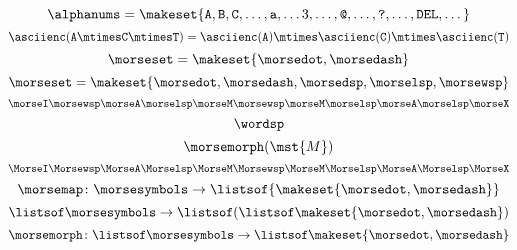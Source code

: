 {\begin{forslides}
\begin{equation}
    \end{equation}
    \begin{equation}
        \label{eq:alphanums_list}
        \alphanums = \makeset{ \texttt{A}, \texttt{B}, \texttt{C}, \dots, \texttt{a}, \dots 3, \dots,  \texttt{@}, \dots, \texttt{?}, \dots, \texttt{DEL}, \dots }
    \end{equation}
    \begin{equation}
        \label{eq:alphanums_list_comp}
        \asciienc( \texttt{A} \mtimes  \texttt{C} \mtimes \texttt{T})
        =\asciienc(\texttt{A}) \mtimes   \asciienc(\texttt{C}) \mtimes \asciienc(\texttt{T})
    \end{equation}
    \begin{equation}
        \label{eq:morse-symbols}
        \morseset = \makeset{ \morsedot, \morsedash }
    \end{equation}
    \begin{equation}
        \label{eq:morse-alphabet-5}
        \morseset = \makeset{ \morsedot,  \morsedash,  \morsedsp,  \morselsp, \morsewsp }
    \end{equation}
    \begin{equation}
        \label{eq:IAMMAX}
        \morseI \morsewsp \morseA \morselsp \morseM \morsewsp \morseM \morselsp \morseA \morselsp \morseX
    \end{equation}
    \begin{equation}
        \label{eq:wordsp}
        \wordsp
    \end{equation}
    \begin{equation}
        \label{eq:morsem}
        \morsemorph(\mst{M})
    \end{equation}
    \begin{equation}
        \label{eq:IAMMAXsignal}
        \MorseI \Morsewsp \MorseA \Morselsp \MorseM \Morsewsp \MorseM \Morselsp \MorseA \Morselsp \MorseX
    \end{equation}
    \begin{equation}
        \label{eq:morsemap}
        \morsemap \colon \morsesymbols \to  \listsof {\makeset{\morsedot, \morsedash}}
    \end{equation}
    \begin{equation}
        \label{eq:morsemorph0}
        \listsof\morsesymbols \to   \listsof(\listsof \makeset{\morsedot, \morsedash})
    \end{equation}
    \begin{equation}
        \label{eq:morsemorph}
        \morsemorph \colon \listsof\morsesymbols \to   \listsof \makeset{\morsedot, \morsedash}

\end{equation}
\end{forslides}}
